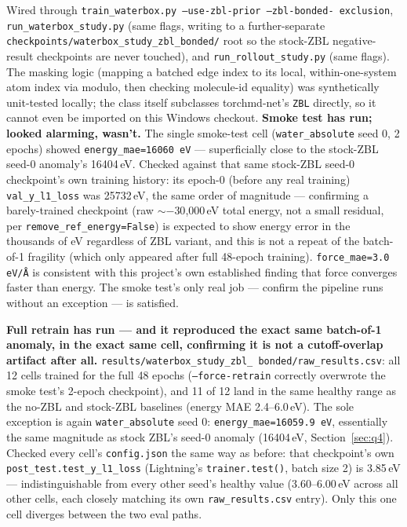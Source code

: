 \documentclass[11pt]{article}
\begin{document}
Wired through \texttt{train\_waterbox.py --use-zbl-prior --zbl-bonded-
exclusion}, \texttt{run\_waterbox\_study.py} (same flags, writing to a
further-separate \texttt{checkpoints/waterbox\_study\_zbl\_bonded/} root so
the stock-ZBL negative-result checkpoints are never touched), and
\texttt{run\_rollout\_study.py} (same flags). The masking logic (mapping a
batched edge index to its local, within-one-system atom index via modulo,
then checking molecule-id equality) was synthetically unit-tested locally;
the class itself subclasses torchmd-net's \texttt{ZBL} directly, so it
cannot even be imported on this Windows checkout.
\textbf{Smoke test has run; looked alarming, wasn't.} The single smoke-test
cell (\texttt{water\_absolute} seed 0, 2 epochs) showed
\texttt{energy\_mae=16060\,eV} --- superficially close to the stock-ZBL
seed-0 anomaly's 16404\,eV. Checked against that same stock-ZBL seed-0
checkpoint's own training history: its epoch-0 (before any real training)
\texttt{val\_y\_l1\_loss} was 25732\,eV, the same order of magnitude ---
confirming a barely-trained checkpoint (raw $\sim{-}$30{,}000\,eV total
energy, not a small residual, per \texttt{remove\_ref\_energy=False}) is
expected to show energy error in the thousands of eV regardless of ZBL
variant, and this is not a repeat of the batch-of-1 fragility (which only
appeared after full 48-epoch training). \texttt{force\_mae=3.0\,eV/\AA} is
consistent with this project's own established finding that force converges
faster than energy. The smoke test's only real job --- confirm the pipeline
runs without an exception --- is satisfied.

\textbf{Full retrain has run --- and it reproduced the exact same
batch-of-1 anomaly, in the exact same cell, confirming it is not a
cutoff-overlap artifact after all.} \texttt{results/waterbox\_study\_zbl\_
bonded/raw\_results.csv}: all 12 cells trained for the full 48 epochs
(\texttt{--force-retrain} correctly overwrote the smoke test's 2-epoch
checkpoint), and 11 of 12 land in the same healthy range as the no-ZBL and
stock-ZBL baselines (energy MAE 2.4--6.0\,eV). The sole exception is again
\texttt{water\_absolute} seed 0: \texttt{energy\_mae=16059.9\,eV},
essentially the same magnitude as stock ZBL's seed-0 anomaly
(16404\,eV, Section~\ref{sec:q4}). Checked every cell's \texttt{config.json}
the same way as before: that checkpoint's own
\texttt{post\_test.test\_y\_l1\_loss} (Lightning's \texttt{trainer.test()},
batch size 2) is 3.85\,eV --- indistinguishable from every other seed's
healthy value (3.60--6.00\,eV across all other cells, each closely matching
its own \texttt{raw\_results.csv} entry). Only this one cell diverges
between the two eval paths.
\end{document}
